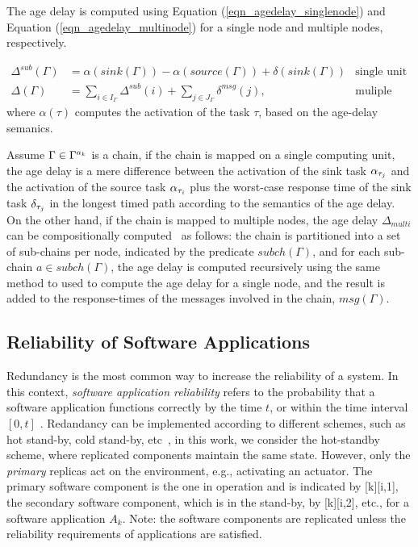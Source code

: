 {The age delay is computed using Equation (\ref{eqn_agedelay_singlenode}) and Equation (\ref{eqn_agedelay_multinode}) for a single node and multiple nodes, respectively.

\begin{align}
	\label{eqn_agedelay_singlenode}
	\Delta^{sub}(\Gamma) &= \alpha(sink(\Gamma))-\alpha(source(\Gamma)) + \delta(sink(\Gamma)) & \text{single unit}\\
	\label{eqn_agedelay_multinode}
	\Delta(\Gamma)&=\sum_{i\in I_{\Gamma}}{\Delta^{sub}(i)} + \sum_{j\in  J_{\Gamma}}{\delta^{msg}(j)}, &\text{muliple units}
\end{align}
where $\alpha(\tau)$ computes the activation of the task $\tau$, based on the age-delay semanics.

Assume $\Gamma \in \ssp{\Gamma}$ is a chain, if the chain is mapped on a single computing unit, the age delay is a mere difference between the activation of the sink task $\ssb{\alpha}[\tau_j]$ and the activation of the source task $\ssb{\alpha}[\tau_i]$ plus the worst-case response time of the sink task $\ssb{\delta}[\tau_j]$ in the longest timed path according to the semantics of the age delay. On the other hand, if the chain is mapped to multiple nodes, the age delay $\Delta_{multi}$ can be compositionally computed~\cite{Feiertag2009ASemantics} as follows: the chain is partitioned  into a set of sub-chains per node, indicated by the predicate $subch(\Gamma)$, and for each sub-chain $a\in subch(\Gamma)$, the age delay is computed recursively using the same method to used to compute the age delay for a single node, and the result is added to the response-times of the messages involved in the chain, $msg(\Gamma)$.

\subsection{Reliability of Software Applications}\label{sub_reliability}
Redundancy is the most common way to increase the reliability of a system. In this context, \textit{software application reliability} refers to the probability that a software application functions correctly by the time $t$, or within the time interval $[0, t]$ \cite{Goel1985SoftwareApplicability}. Redandancy can be implemented according to different schemes, such as hot stand-by, cold stand-by, etc~\cite{Dubrova2013Fault-tolerantDesign}, in this work, we consider the hot-standby scheme, where replicated components maintain the same state. However, only the \textit{primary} replicas act on the environment, e.g., activating an actuator. The primary software component is the one in operation and is indicated by [k][i,1], the secondary software component, which is in the stand-by, by [k][i,2], etc., for a software application $A_k$.  Note: the software components are replicated unless the reliability requirements of applications are satisfied.

}
